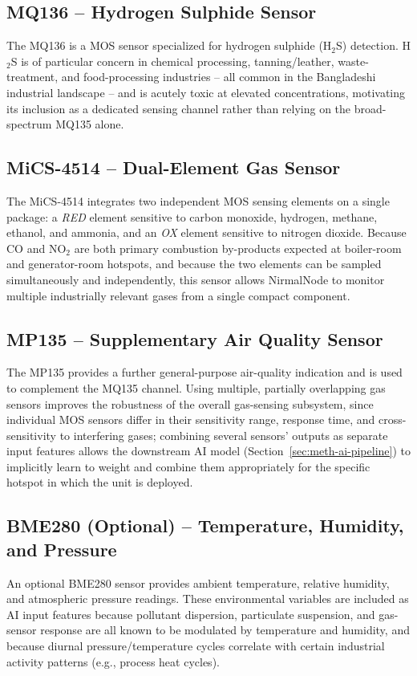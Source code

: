 \subsection{MQ136 -- Hydrogen Sulphide Sensor}
The MQ136 is a MOS sensor specialized for hydrogen sulphide (H$_2$S) detection. H$_2$S is of particular concern in chemical processing, tanning/leather, waste-treatment, and food-processing industries -- all common in the Bangladeshi industrial landscape -- and is acutely toxic at elevated concentrations, motivating its inclusion as a dedicated sensing channel rather than relying on the broad-spectrum MQ135 alone.

\subsection{MiCS-4514 -- Dual-Element Gas Sensor}
The MiCS-4514 integrates two independent MOS sensing elements on a single package: a \emph{RED} element sensitive to carbon monoxide, hydrogen, methane, ethanol, and ammonia, and an \emph{OX} element sensitive to nitrogen dioxide. Because CO and NO$_2$ are both primary combustion by-products expected at boiler-room and generator-room hotspots, and because the two elements can be sampled simultaneously and independently, this sensor allows NirmalNode to monitor multiple industrially relevant gases from a single compact component.

\subsection{MP135 -- Supplementary Air Quality Sensor}
The MP135 provides a further general-purpose air-quality indication and is used to complement the MQ135 channel. Using multiple, partially overlapping gas sensors improves the robustness of the overall gas-sensing subsystem, since individual MOS sensors differ in their sensitivity range, response time, and cross-sensitivity to interfering gases; combining several sensors' outputs as separate input features allows the downstream AI model (Section~\ref{sec:meth-ai-pipeline}) to implicitly learn to weight and combine them appropriately for the specific hotspot in which the unit is deployed.

\subsection{BME280 (Optional) -- Temperature, Humidity, and Pressure}
An optional BME280 sensor provides ambient temperature, relative humidity, and atmospheric pressure readings. These environmental variables are included as AI input features because pollutant dispersion, particulate suspension, and gas-sensor response are all known to be modulated by temperature and humidity, and because diurnal pressure/temperature cycles correlate with certain industrial activity patterns (e.g., process heat cycles).

